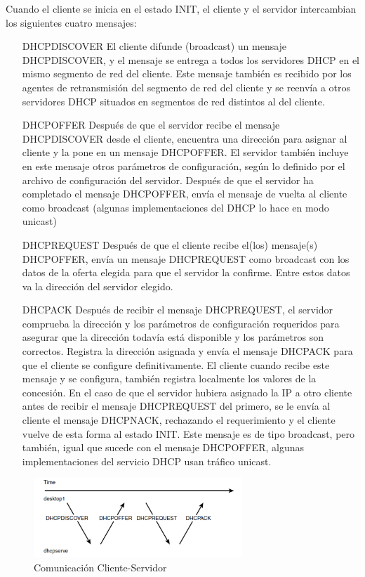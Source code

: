 Cuando el cliente se inicia en el estado INIT, el cliente y el servidor intercambian los siguientes cuatro mensajes:
\begin{itemize}
	\item[\color{airforceblue}DHCPDISCOVER]  El cliente difunde (broadcast) un mensaje DHCPDISCOVER, y el mensaje se entrega a todos los servidores DHCP en el mismo segmento de red del cliente. Este mensaje también es recibido por los agentes de retransmisión del segmento de red del cliente y se reenvía a otros servidores DHCP situados en segmentos de red distintos al del cliente.
	\item[\color{airforceblue}DHCPOFFER] Después de que el servidor recibe el mensaje DHCPDISCOVER desde el cliente, encuentra una dirección para asignar al cliente y la pone en un mensaje DHCPOFFER. El servidor también incluye en este mensaje otros parámetros de configuración, según lo definido por el archivo de configuración del servidor. Después de que el servidor ha completado el mensaje DHCPOFFER, envía el mensaje de vuelta al cliente como broadcast (algunas implementaciones del DHCP lo hace en modo unicast)
	\item[\color{airforceblue}DHCPREQUEST]  Después de que el cliente recibe el(los) mensaje(s) DHCPOFFER, envía un mensaje DHCPREQUEST como broadcast con los datos de la oferta elegida para que el servidor la confirme. Entre estos datos va la dirección del servidor elegido.
	\item[\color{airforceblue}DHCPACK] Después de recibir el mensaje DHCPREQUEST, el servidor comprueba la dirección y los parámetros de configuración requeridos para asegurar que la dirección todavía está disponible y los parámetros son correctos. Registra la dirección asignada y envía el mensaje DHCPACK para que el cliente se configure definitivamente. El cliente cuando recibe este mensaje y se configura, también registra localmente los valores de la concesión. En el caso de que el servidor hubiera asignado la IP a otro cliente antes de recibir el mensaje DHCPREQUEST del primero, se le envía al cliente el mensaje DHCPNACK, rechazando el requerimiento y el cliente vuelve de esta forma al estado INIT. Este mensaje es de tipo broadcast, pero también, igual que sucede con el mensaje DHCPOFFER, algunas implementaciones del servicio DHCP usan tráfico unicast.
\end{itemize}

\begin{figure}
  \centering
    \includegraphics[width=0.7\textwidth]{img/com}
  \caption{Comunicación Cliente-Servidor}
  \label{fig:2}
\end{figure}

